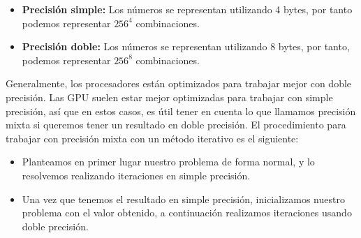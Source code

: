 \begin{itemize}
\item \textbf{Precisión simple: } Los números se representan utilizando 4 bytes, por tanto podemos representar $256^4$ combinaciones.
  
\item \textbf{Precisión doble: } Los números se representan utilizando 8 bytes, por tanto, podemos representar $256^8$ combinaciones.
\end{itemize}

Generalmente, los procesadores están optimizados para trabajar mejor con doble precisión. Las GPU suelen estar mejor optimizadas para trabajar con simple precisión, así que en estos casos, es útil tener en cuenta lo que llamamos precisión mixta si queremos tener un resultado en doble precisión. El procedimiento para trabajar con precisión mixta con un método iterativo es el siguiente:

\begin{itemize}
\item Planteamos en primer lugar nuestro problema de forma normal, y lo resolvemos realizando iteraciones en simple precisión.
\item Una vez que tenemos el resultado en simple precisión, inicializamos nuestro problema con el valor obtenido, a continuación realizamos iteraciones usando doble precisión.
\end{itemize}

